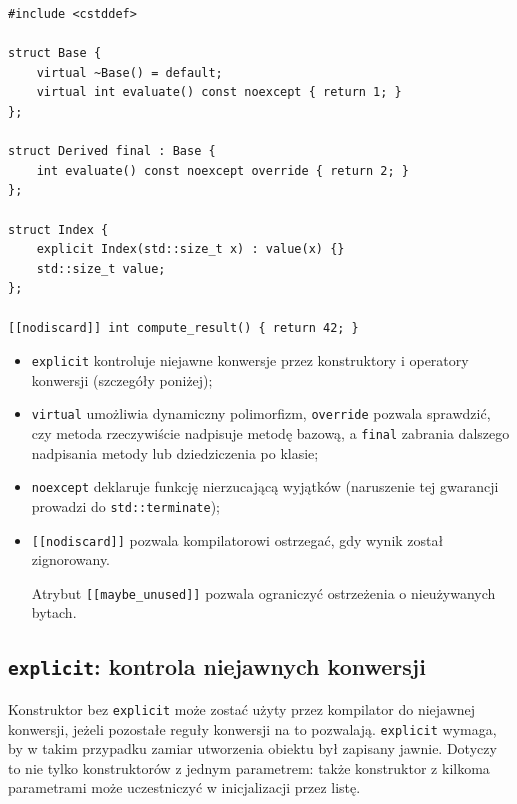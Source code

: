 \begin{lstlisting}
#include <cstddef>

struct Base {
    virtual ~Base() = default;
    virtual int evaluate() const noexcept { return 1; }
};

struct Derived final : Base {
    int evaluate() const noexcept override { return 2; }
};

struct Index {
    explicit Index(std::size_t x) : value(x) {}
    std::size_t value;
};

[[nodiscard]] int compute_result() { return 42; }
\end{lstlisting}

\begin{itemize}
    \item \texttt{explicit} kontroluje niejawne konwersje
    przez konstruktory i operatory konwersji (szczegóły poniżej);
    \item \texttt{virtual} umożliwia dynamiczny polimorfizm,
    \texttt{override} pozwala sprawdzić, czy metoda rzeczywiście
    nadpisuje metodę bazową, a \texttt{final} zabrania dalszego
    nadpisania metody lub dziedziczenia po klasie;
    \item \texttt{noexcept} deklaruje funkcję nierzucającą wyjątków
    (naruszenie tej gwarancji prowadzi do \texttt{std::terminate});
    \item \texttt{[[nodiscard]]} pozwala kompilatorowi ostrzegać,
    gdy wynik został zignorowany.

    Atrybut \texttt{[[maybe\_unused]]} pozwala ograniczyć
    ostrzeżenia o nieużywanych bytach.
\end{itemize}

\subsection{\texttt{explicit}: kontrola niejawnych konwersji}

Konstruktor bez \texttt{explicit} może zostać użyty przez kompilator do
niejawnej konwersji, jeżeli pozostałe reguły konwersji na to pozwalają.
\texttt{explicit} wymaga, by w takim przypadku zamiar utworzenia obiektu
był zapisany jawnie. Dotyczy to nie tylko konstruktorów z jednym
parametrem: także konstruktor z kilkoma parametrami może uczestniczyć
w inicjalizacji przez listę.

